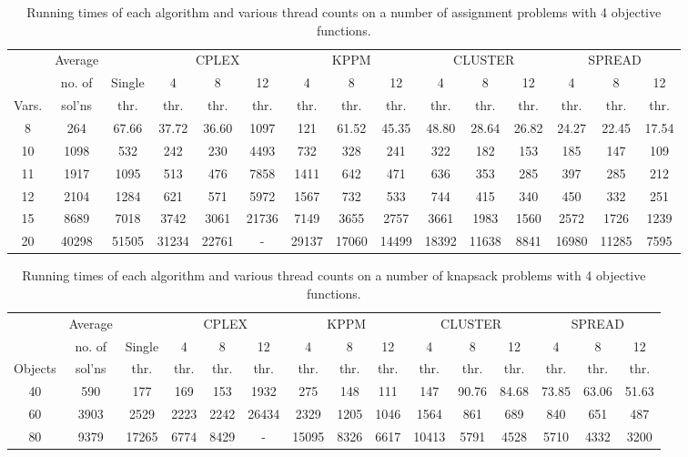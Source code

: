 \documentclass{amsart}
\theoremstyle{definition}
\begin{document}
\begin{table}\footnotesize
\begin{tabular}{c|c|c|ccc|ccc|ccc|ccc}
  & Average & & \multicolumn{3}{c|}{CPLEX}& \multicolumn{3}{c|}{KPPM}& \multicolumn{3}{c|}{CLUSTER} & \multicolumn{3}{c}{SPREAD}\\
& no. of & Single & 4 & 8 & 12 & 4 & 8 & 12 & 4 & 8 & 12 & 4 & 8 & 12\\
Vars. & sol'ns & thr. & thr. & thr. & thr. & thr. & thr. & thr. & thr. & thr. & thr. & thr. & thr. & thr. \\
\hline
8 & 264 & 67.66 & 37.72 & 36.60 & 1097 & 121 & 61.52 & 45.35 & 48.80 & 28.64 & 26.82 & 24.27 & 22.45 & 17.54 \\ 
10 & 1098 & 532 & 242 & 230 & 4493 & 732 & 328 & 241 & 322 & 182 & 153 & 185 & 147 & 109 \\ 
11 & 1917 & 1095 & 513 & 476 & 7858 & 1411 & 642 & 471 & 636 & 353 & 285 & 397 & 285 & 212 \\ 
12 & 2104 & 1284 & 621 & 571 & 5972 & 1567 & 732 & 533 & 744 & 415 & 340 & 450 & 332 & 251 \\ 
15 & 8689 & 7018 & 3742 & 3061 & 21736 & 7149 & 3655 & 2757 & 3661 & 1983 & 1560 & 2572 & 1726 & 1239 \\ 
20 & 40298 & 51505 & 31234 & 22761 & - & 29137 & 17060 & 14499 & 18392 & 11638 & 8841 & 16980 & 11285 & 7595 \\ 

\end{tabular}
\caption{Running times of each algorithm and various thread counts on a number of assignment problems with 4 objective functions.}
\label{tab:ap}
\end{table}
\begin{table}\footnotesize
\begin{tabular}{c|c|c|ccc|ccc|ccc|ccc}
  & Average & & \multicolumn{3}{c|}{CPLEX}& \multicolumn{3}{c|}{KPPM}& \multicolumn{3}{c|}{CLUSTER} & \multicolumn{3}{c}{SPREAD}\\
& no. of & Single & 4 & 8 & 12 & 4 & 8 & 12 & 4 & 8 & 12 & 4 & 8 & 12\\
Objects & sol'ns & thr. & thr. & thr. & thr. & thr. & thr. & thr. & thr. & thr. & thr. & thr. & thr. & thr. \\
\hline
40 & 590 & 177 & 169 & 153 & 1932 & 275 & 148 & 111 & 147 & 90.76 & 84.68 & 73.85 & 63.06 & 51.63 \\ 
60 & 3903 & 2529 & 2223 & 2242 & 26434 & 2329 & 1205 & 1046 & 1564 & 861 & 689 & 840 & 651 & 487 \\ 
80 & 9379 & 17265 & 6774 & 8429 & - & 15095 & 8326 & 6617 & 10413 & 5791 & 4528 & 5710 & 4332 & 3200 \\ 

\end{tabular}
\caption{Running times of each algorithm and various thread counts on a number of knapsack problems with 4 objective functions.}
\label{tab:kp}
\end{table}
\end{document}
